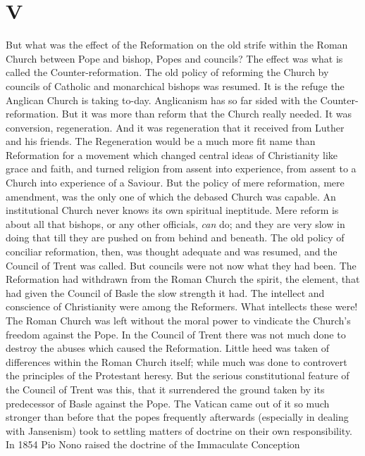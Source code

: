 \documentclass[12pt,a5paper,twoside]{book}
\begin{document}
\section*{V} 

But what was the effect of the Reformation on the 
old strife within the Roman Church between Pope 
and bishop, Popes and councils? The effect was 
what is called the Counter-reformation. The old 
policy of reforming the Church by councils of 
Catholic and monarchical bishops was resumed. It 
is the refuge the Anglican Church is taking to-day. 
Anglicanism has so far sided with the Counter-reformation. 
But it was more than reform that the Church 
really needed. It was conversion, regeneration. And it 
was regeneration that it received from Luther and his 
friends. The Regeneration would be a much more 
fit name than Reformation for a movement which 
changed central ideas of Christianity like grace and 
faith, and turned religion from assent into experience, 
from assent to a Church into experience of a Saviour. 
But the policy of mere reformation, mere amendment, 
was the only one of which the debased Church was 
capable. An institutional Church never knows its 
own spiritual ineptitude. Mere reform is about all 
that bishops, or any other officials, \textit{can} do; and they 
are very slow in doing that till they are pushed on 
from behind and beneath. The old policy of conciliar 
reformation, then, was thought adequate and was 
resumed, and the Council of Trent was called. But 
councils were not now what they had been. The 
Reformation had withdrawn from the Roman Church 
the spirit, the element, that had given the Council of 
Basle the slow strength it had. The intellect and conscience 
of Christianity were among the Reformers. 
What intellects these were! The Roman Church was 
left without the moral power to vindicate the Church's 
freedom against the Pope. In the Council of Trent 
there was not much done to destroy the abuses which 
caused the Reformation. Little heed was taken of 
differences within the Roman Church itself; while 
much was done to controvert the principles of the Protestant 
heresy. But the serious constitutional feature 
of the Council of Trent was this, that it surrendered 
the ground taken by its predecessor of Basle against the 
Pope. The Vatican came out of it so much stronger 
than before that the popes frequently afterwards (especially 
in dealing with Jansenism) took to settling matters 
of doctrine on their own responsibility. In 1854 Pio 
Nono raised the doctrine of the Immaculate Conception 
\end{document}
